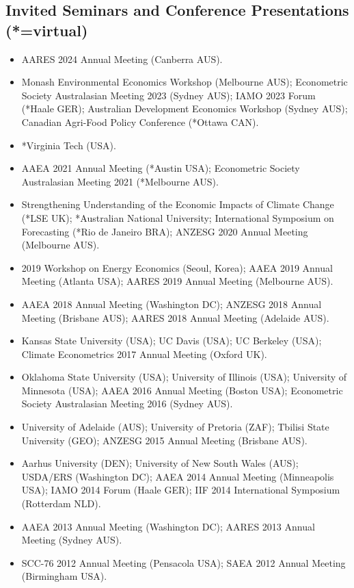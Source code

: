 \documentclass[10pt]{article}
\begin{document}
	\subsection*{Invited Seminars and Conference Presentations (*=virtual)}
	\begin{itemize}
		\item {} AARES 2024 Annual Meeting (Canberra AUS).
		\item {} Monash Environmental Economics Workshop (Melbourne AUS); Econometric Society Australasian Meeting 2023 (Sydney AUS); IAMO 2023 Forum (*Haale GER); Australian Development Economics Workshop (Sydney AUS); Canadian Agri-Food Policy Conference (*Ottawa CAN).
		\item {} *Virginia Tech (USA).
		\item {} AAEA 2021 Annual Meeting (*Austin USA); Econometric Society Australasian Meeting 2021 (*Melbourne AUS).
		\item {} Strengthening Understanding of the Economic Impacts of Climate Change (*LSE UK); *Australian National University; International Symposium on Forecasting (*Rio de Janeiro BRA); ANZESG 2020 Annual Meeting (Melbourne AUS).
		\item {} 2019 Workshop on Energy Economics (Seoul, Korea); AAEA 2019 Annual Meeting (Atlanta USA); AARES 2019 Annual Meeting (Melbourne AUS).
		\item {} AAEA 2018 Annual Meeting (Washington DC); ANZESG 2018 Annual Meeting (Brisbane AUS); AARES 2018 Annual Meeting (Adelaide AUS).
		\item {} Kansas State University (USA); UC Davis (USA); UC Berkeley (USA); Climate Econometrics 2017 Annual Meeting (Oxford UK).
		\item {} Oklahoma State University (USA); University of Illinois (USA); University of Minnesota (USA); AAEA 2016 Annual Meeting (Boston USA); Econometric Society Australasian Meeting 2016 (Sydney AUS).
		\item {} University of Adelaide (AUS); University of Pretoria (ZAF); Tbilisi State University (GEO); ANZESG 2015 Annual Meeting (Brisbane AUS).
		\item {} Aarhus University (DEN); University of New South Wales (AUS); USDA/ERS (Washington DC); AAEA 2014 Annual Meeting (Minneapolis USA); IAMO 2014 Forum (Haale GER); IIF 2014 International Symposium (Rotterdam NLD).
		\item {} AAEA 2013 Annual Meeting (Washington DC); AARES 2013 Annual Meeting (Sydney AUS).
		\item {} SCC-76 2012 Annual Meeting (Pensacola USA); SAEA 2012 Annual Meeting (Birmingham USA).
	\end{itemize}
	
\end{document}
